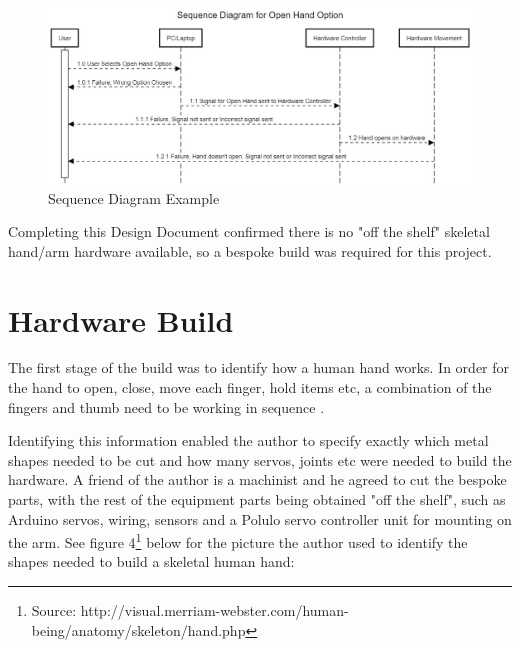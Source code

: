 \documentclass[progress]{cmpreport}
\begin{document}
\begin{figure}[H] 
	\caption{Sequence Diagram Example }
	\centering
	\includegraphics[width=1 \textwidth, height=0.3 \textheight]{photos/sequence_diagram.jpg}
\end{figure}

Completing this Design Document confirmed there is no "off the shelf" skeletal hand/arm hardware available, so a bespoke build was required for this project.

\section{Hardware Build}
The first stage of the build was to identify how a human hand works. In order for the hand to open, close, move each finger, hold items etc, a combination of the fingers and thumb need to be working in sequence \citep{freivalds2011biomechanics}. 

Identifying this information enabled the author to specify exactly which metal shapes needed to be cut and how many servos, joints etc were needed to build the hardware. A friend of the author is a machinist and he agreed to cut the bespoke parts, with the rest of the equipment parts being obtained "off the shelf", such as Arduino servos, wiring, sensors and a Polulo servo controller unit for mounting on the arm. See figure 4\footnote {Source: http://visual.merriam-webster.com/human-being/anatomy/skeleton/hand.php} below for the picture the author used to identify the shapes needed to build a skeletal human hand:
\end{document}
